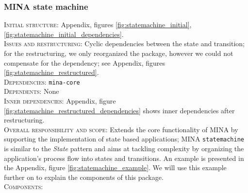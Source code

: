 \subsubsection{MINA state machine}
\textsc{Initial structure}: Appendix, figures \ref{fig:statemachine_initial}, \ref{fig:statemachine_initial_dependencies}.\\
\textsc{Issues and restructuring}: Cyclic dependencies between the state and transition; for the restructuring, we only reorganized the package, however we could not compensate for the dependency; see Appendix, figures \ref{fig:statemachine_restructured}. \\
\textsc{Dependencies}: \texttt{mina-core}\\
\textsc{Dependents}: None\\
\textsc{Inner dependencies}: Appendix, figure \ref{fig:statemachine_restructured_dependencies} shows inner dependencies after restructuring. \\
\textsc{Overall responsibility and scope}: Extends the core functionality of MINA by supporting the implementation of state based applications; MINA \texttt{statemachine} is similar to the \textit{State} pattern and aims at tackling complexity by organizing the application's process flow into states and transitions. An example is presented in the Appendix, figure \ref{fig:statemachine_example}. We will use this example further on to explain the components of this package. \\
\textsc{Components}: 
